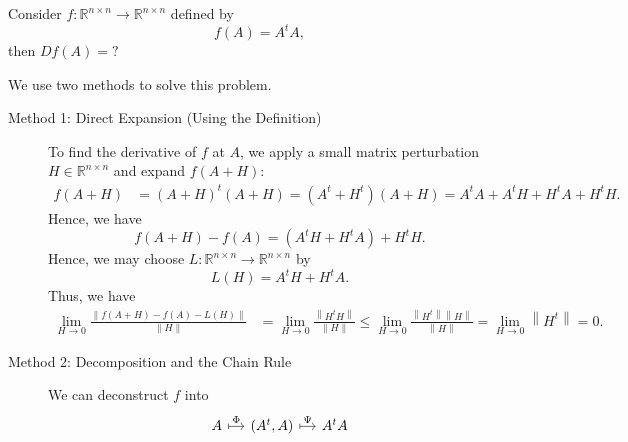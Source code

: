 \begin{eg}
    Consider \(f : \mathbb{R} ^{n \times n} \to \mathbb{R} ^{n \times n}\) defined by 
    \[
        f(A) = A^t A,
    \] 
    then \(Df(A) = ?\) 
\end{eg}
\begin{explanation}
We use two methods to solve this problem.
    \begin{description}
        \item [Method 1: Direct Expansion (Using the Definition)] To find the derivative of \(f\) at \(A\), we apply a small matrix perturbation \(H \in \mathbb{R} ^{n \times n}\) and expand \(f(A + H)\):
        \begin{align*}
            f(A+H) &= (A+H)^t(A+H) = \left( A^t + H^t \right)(A + H) = A^t A + A^t H + H^t A + H^t H. 
        \end{align*}
        Hence, we have 
        \[
            f(A + H) - f(A) = \left( A^t H + H^t A \right) + H^t H. 
        \]
        Hence, we may choose \(L: \mathbb{R} ^{n \times n} \to \mathbb{R} ^{n \times n}\) by 
        \[
            L(H) = A^t H + H^t A.
        \]
        Thus, we have 
        \begin{align*}
            \lim_{H \to 0} \frac{\left\lVert f(A + H) - f(A) - L(H) \right\rVert }{\lVert H \rVert } &= \lim_{H \to 0} \frac{\left\lVert H^t H \right\rVert }{\lVert H \rVert } \le \lim_{H \to 0} \frac{\left\lVert H^t \right\rVert \left\lVert H \right\rVert  }{\left\lVert H \right\rVert } = \lim_{H \to 0} \left\lVert H^t \right\rVert = 0.
        \end{align*}
        \item [Method 2: Decomposition and the Chain Rule]
        We can deconstruct \(f\) into 
\[\begin{tikzcd}[column sep=tiny]
	A && {\left(A^t, A\right)} && {A^t A}
	\arrow["\Phi", maps to, from=1-1, to=1-3]
	\arrow["\Psi", maps to, from=1-3, to=1-5]
\end{tikzcd}\]


\end{description}
\end{explanation}
